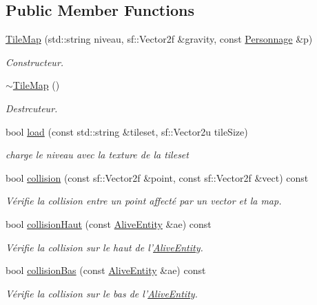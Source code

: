 \subsection*{Public Member Functions}
\begin{DoxyCompactItemize}
\item 
\hyperlink{class_tile_map_a20b74c68d508aefc556237ca98b6d84f}{Tile\+Map} (std\+::string niveau, sf\+::\+Vector2f \&gravity, const \hyperlink{class_personnage}{Personnage} \&p)
\begin{DoxyCompactList}\small\item\em Constructeur. \end{DoxyCompactList}\item 
\hyperlink{class_tile_map_a3448728e45d6a43fff3a02d4c6d72e9d}{$\sim$\+Tile\+Map} ()
\begin{DoxyCompactList}\small\item\em Destrcuteur. \end{DoxyCompactList}\item 
bool \hyperlink{class_tile_map_a5126cb10237b3d0c0c9cbcf4dca849ac}{load} (const std\+::string \&tileset, sf\+::\+Vector2u tile\+Size)
\begin{DoxyCompactList}\small\item\em charge le niveau avec la texture de la tileset \end{DoxyCompactList}\item 
bool \hyperlink{class_tile_map_a2dc99a84ead7dac1481375144a990412}{collision} (const sf\+::\+Vector2f \&point, const sf\+::\+Vector2f \&vect) const 
\begin{DoxyCompactList}\small\item\em Vérifie la collision entre un point affecté par un vector et la map. \end{DoxyCompactList}\item 
bool \hyperlink{class_tile_map_a543431b7e68211aad223ae8c7b1086c0}{collision\+Haut} (const \hyperlink{class_alive_entity}{Alive\+Entity} \&ae) const 
\begin{DoxyCompactList}\small\item\em Vérifie la collision sur le haut de l'\hyperlink{class_alive_entity}{Alive\+Entity}. \end{DoxyCompactList}\item 
bool \hyperlink{class_tile_map_af0255568dfc16a024d6107722860db36}{collision\+Bas} (const \hyperlink{class_alive_entity}{Alive\+Entity} \&ae) const 
\begin{DoxyCompactList}\small\item\em Vérifie la collision sur le bas de l'\hyperlink{class_alive_entity}{Alive\+Entity}. \end{DoxyCompactList}\item 

\end{DoxyCompactItemize}
